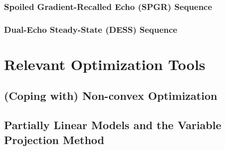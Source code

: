 \subsubsection{Spoiled Gradient-Recalled Echo (SPGR) Sequence}
\label{sss,bkgrd,mri,ss,spgr}

\subsubsection{Dual-Echo Steady-State (DESS) Sequence}
\label{sss,bkgrd,mri,ss,dess}


\section{Relevant Optimization Tools}
\label{s,bkgrd,opt}

\subsection{(Coping with) Non-convex Optimization}
\label{ss,bkgrd,opt,ncvx}

\subsection{Partially Linear Models and the Variable Projection Method}
\label{ss,bkgrd,opt,vpm}